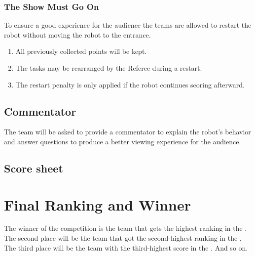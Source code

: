 \subsubsection{The Show Must Go On}
To ensure a good experience for the audience the teams are allowed to restart the robot without moving the robot to the entrance.
\begin{enumerate}[nosep]
  \item All previously collected points will be kept.
  \item The tasks may be rearranged by the Referee during a restart.
  \item The restart penalty is only applied if the robot continues scoring afterward.
\end{enumerate}

\subsection{Commentator}
The team will be asked to provide a commentator to explain the robot's behavior and answer questions to produce a better viewing experience for the audience.


\subsection*{Score sheet}


\section{Final Ranking and Winner}

The winner of the competition is the team that gets the highest ranking in the .
The second place will be the team that got the second-highest ranking in the .
The third place will be the team with the third-highest score in the .
And so on.



